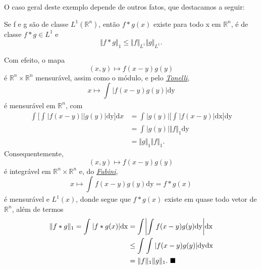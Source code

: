 \documentclass[../distribution_theory_notes.tex]{subfiles}
\begin{document}
             O caso geral deste exemplo depende de outros fatos, que destacamos a seguir:
           \begin{lemma*}
             Se f e g são de classe \(L^{1}(\mathbb{R}^{n})\), então \(f*g(x)\) existe para todo x em \(\mathbb{R}^{n}\), é de classe \(f*g\in L^{1}\) e 
               \[
                 \Vert f*g \Vert_1\leq \Vert f \Vert_{L^{1}}\Vert g \Vert_{L^{1}}.
               \]
           \end{lemma*}
          \begin{proof*}
            Com efeito, o mapa 
              \[
                (x, y)\mapsto f(x-y)g(y)
              \]
              é \(\mathbb{R}^{n}\times \mathbb{R}^{n}\) mensurável, assim como o módulo, e pelo \hyperlink{fubini_tonelli}{\textit{Tonelli}}, 
                \[
                  x\mapsto \int_{}^{}| f(x-y)g(y) | \mathrm{dy}
                \]
                é mensurável em \(\mathbb{R}^{n}\), com 
               \begin{align*}
                 \int_{}^{}\biggl[\int_{}^{}| f(x-y) || g(y) | \mathrm{dy}\biggr] \mathrm{d}x &= \int_{}^{}| g(y) |\biggl[\int_{}^{}| f(x-y) | \mathrm{dx}\biggr] \mathrm{dy}\\ 
                                                                                              &= \int_{}^{}| g(y) |\Vert f \Vert_{1} \mathrm{dy}\\ 
                                                                                              &= \Vert g \Vert_1 \Vert f \Vert_1. 
               \end{align*}
               Consequentemente, 
                 \[
                   (x, y)\mapsto f(x-y)g(y)
                 \]
                 é integrável em \(\mathbb{R}^{n}\times \mathbb{R}^{n}\) e, do \hyperlink{fubini_tonelli}{\textit{Fubini}}, 
                   \[
                     x\mapsto \int_{}^{}f(x-y)g(y) \mathrm{dy}=f*g(x)
                   \]
                   é mensurável e \(L^{1}(x)\), donde segue que \(f*g(x)\) existe em quase todo vetor de \(\mathbb{R}^{n}\), além de termos 
                  \begin{align*}
                    \Vert f*g \Vert_1 = \int_{}^{}| f*g(x) | \mathrm{dx}&= \int_{}^{}\biggl\vert \int_{}^{}f(x-y)g(y) \mathrm{dy} \biggr\vert \mathrm{dx}\\ 
                                                                        &\leq \int_{}^{}\int_{}^{} | f(x-y)g(y) | \mathrm{dy} \mathrm{dx}\\ 
                                                                        &=\Vert f \Vert_1 \Vert g \Vert_1.\text{ $\blacksquare$}
                  \end{align*}
          \end{proof*}
\end{document}
